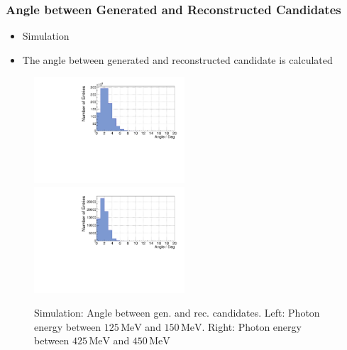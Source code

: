 \documentclass[slidestop,compress,mathserif]{beamer}
\begin{document}
\begin{frame}
	\frametitle{Angle between Generated and Reconstructed Candidates }

\begin{itemize}
	\item Simulation
	\item The angle between generated and reconstructed candidate is calculated
\end{itemize}

\begin{figure}
	\includegraphics[width=0.5\textwidth]{Pictures/20172604AngleRegGen100-125MeV}
	\includegraphics[width=0.5\textwidth]{Pictures/20172604AngleRegGen400-425MeV}
	\caption{Simulation: Angle between gen. and rec. candidates. Left: Photon energy between $125\,\text{MeV}$ and $150\,\text{MeV}$. Right: Photon energy between $425\,\text{MeV} $ and $ 450\,\text{MeV}$}
\end{figure}

\end{frame}
\end{document}

